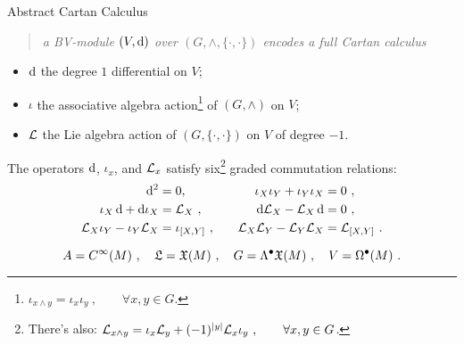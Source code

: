 \documentclass[beamer,10pt]{standalone}
\begin{document}
\begin{frame}{Abstract Cartan Calculus}
  \begin{quote}
    \centering
    \emph{a BV-module $(V,\mathop{}\!\mathrm{d})$ over $(G,\wedge,\lbrace\cdot,\cdot\rbrace)$ encodes a full Cartan calculus}
  \end{quote}
  \vfill\pause
  \begin{denotblock}
    \begin{itemize}
      \item $\mathop{}\!\mathrm{d}$ the degree $1$ differential on $V$;
	    \item $\iota$ the associative algebra action\footnote{$\iota_{x\wedge y}=\iota_x\iota_y~, \qquad \forall x,y\in G$.} of $(G,\wedge)$ on $V$;
  	  \item $\mathcal{L}$ the Lie algebra action
      of $(G,\{\cdot,\cdot\})$ on $V$ of degree $-1$.
    \end{itemize}   
  \end{denotblock}
  \vfill\pause

  \begin{lemblock}
 The operators $\mathop{}\!\mathrm{d}$, $\iota_x$, and $\mathcal{L}_x$ satisfy six\footnote{There's also: $\mathcal{L}_{x\wedge y}=\iota_x\mathcal{L}_y + (-1)^{|y|}\mathcal{L}_x \iota_y~, \qquad \forall  x,y\in G$.}  graded commutation relations:
  \begin{align*}
	  \mathop{}\!\mathrm{d}^2                            &= 0,            &&&
	\iota_X \iota_Y + \iota_Y \iota_X  &= 0 ~,         \\
\iota_X \mathop{}\!\mathrm{d}   +	\mathop{}\!\mathrm{d} \iota_X      &= \mathcal{L}_X ~,    &&&
	\mathop{}\!\mathrm{d} \mathcal{L}_X - \mathcal{L}_X \mathop{}\!\mathrm{d}          &= 0 ~,    \\
	\mathcal{L}_X \iota_Y - \iota_Y \mathcal{L}_X    &= \iota_{[X,Y]}~,  &&&
	\mathcal{L}_X \mathcal{L}_Y - \mathcal{L}_Y \mathcal{L}_X      &= \mathcal{L}_{[X,Y]}~. 
\end{align*}
  \end{lemblock}
  \vfill\pause

  \begin{exblock}
    \vspace{-0.5em}
    $$ A=C^\infty(M)~,  \quad \mathfrak{L}=\mathfrak{X}(M)~,\quad
     G=\Lambda^\bullet \mathfrak{X}(M)~, \quad V=\Omega^\bullet(M)~. $$
  \end{exblock}
\end{frame}
\end{document}
